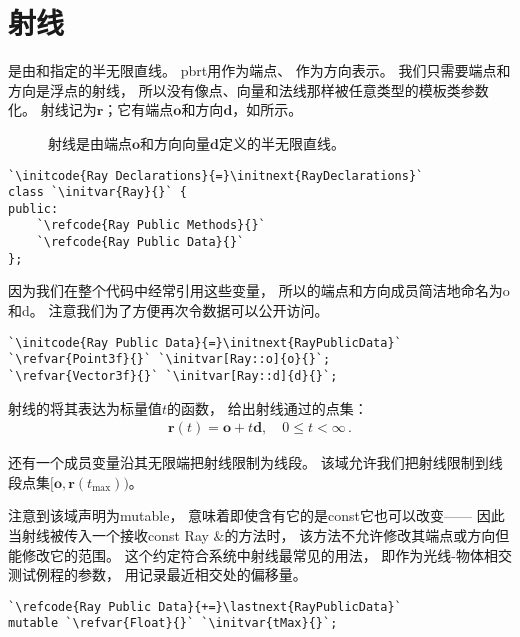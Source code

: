 \section{射线}\label{sec:射线}

是由和指定的半无限直线。
pbrt用作为端点、
作为方向表示。
我们只需要端点和方向是浮点的射线，
所以没有像点、向量和法线那样被任意类型的模板类参数化。
射线记为$\bm r$；它有端点$\bm o$和方向$\bm d$，如所示。
\begin{figure}[htbp]
    \centering
    \caption{射线是由端点$\bm o$和方向向量$\bm d$定义的半无限直线。}
    \label{fig:2.7}
\end{figure}

\begin{lstlisting}
`\initcode{Ray Declarations}{=}\initnext{RayDeclarations}`
class `\initvar{Ray}{}` {
public:
    `\refcode{Ray Public Methods}{}`
    `\refcode{Ray Public Data}{}`
};
\end{lstlisting}

因为我们在整个代码中经常引用这些变量，
所以的端点和方向成员简洁地命名为{\ttfamily o}和{\ttfamily d}。
注意我们为了方便再次令数据可以公开访问。
\begin{lstlisting}
`\initcode{Ray Public Data}{=}\initnext{RayPublicData}`
`\refvar{Point3f}{}` `\initvar[Ray::o]{o}{}`;
`\refvar{Vector3f}{}` `\initvar[Ray::d]{d}{}`;
\end{lstlisting}

射线的将其表达为标量值$t$的函数，
给出射线通过的点集：
\begin{align}\label{eq:2.3}
    \bm r(t)=\bm o+t\bm d,\quad 0\le t<\infty\, .
\end{align}

还有一个成员变量沿其无限端把射线限制为线段。
该域允许我们把射线限制到线段点集$[\bm o,\bm r(t_{\max}))$。

注意到该域声明为{\ttfamily mutable}，
意味着即使含有它的是{\ttfamily const}它也可以改变——
因此当射线被传入一个接收{\ttfamily const Ray \&}的方法时，
该方法不允许修改其端点或方向但能修改它的范围。
这个约定符合系统中射线最常见的用法，
即作为光线-物体相交测试例程的参数，
用记录最近相交处的偏移量。
\begin{lstlisting}
`\refcode{Ray Public Data}{+=}\lastnext{RayPublicData}`
mutable `\refvar{Float}{}` `\initvar{tMax}{}`;
\end{lstlisting}

